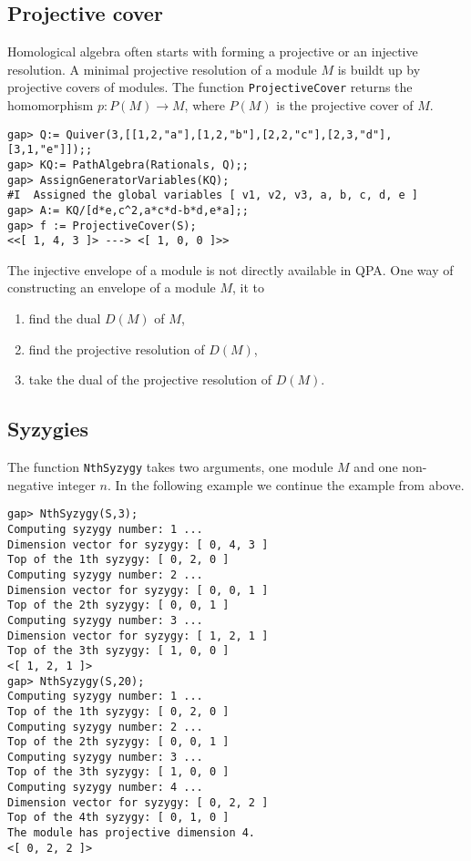 \documentclass{amsart}
\theoremstyle{definition}
\newcommand{\code}[1]{\texttt{#1}}
\theoremstyle{theoretic}
\begin{document}
\subsection{Projective cover}
Homological algebra often starts with forming a projective or an
injective resolution.  A minimal projective resolution of a module $M$
is buildt up by projective covers of modules.  The function
\code{ProjectiveCover} returns the homomorphism $p\colon P(M)\to M$,
where $P(M)$ is the projective cover of $M$.  

\begin{verbatim}
gap> Q:= Quiver(3,[[1,2,"a"],[1,2,"b"],[2,2,"c"],[2,3,"d"],
[3,1,"e"]]);;
gap> KQ:= PathAlgebra(Rationals, Q);;
gap> AssignGeneratorVariables(KQ);
#I  Assigned the global variables [ v1, v2, v3, a, b, c, d, e ]
gap> A:= KQ/[d*e,c^2,a*c*d-b*d,e*a];;
gap> f := ProjectiveCover(S);
<<[ 1, 4, 3 ]> ---> <[ 1, 0, 0 ]>>
\end{verbatim}
The injective envelope of a module is not directly available in QPA.
One way of constructing an envelope of a module $M$, it to 
\begin{enumerate}[\rm(1)]
\item find the dual $D(M)$ of $M$,
\item find the projective resolution of $D(M)$, 
\item take the dual of the projective resolution of $D(M)$. 
\end{enumerate}

\subsection{Syzygies}
The function \code{NthSyzygy} takes two arguments, one module $M$ and
one non-negative integer $n$.  In the following example we continue
the example from above. 
\begin{verbatim}
gap> NthSyzygy(S,3);
Computing syzygy number: 1 ...
Dimension vector for syzygy: [ 0, 4, 3 ]
Top of the 1th syzygy: [ 0, 2, 0 ]
Computing syzygy number: 2 ...
Dimension vector for syzygy: [ 0, 0, 1 ]
Top of the 2th syzygy: [ 0, 0, 1 ]
Computing syzygy number: 3 ...
Dimension vector for syzygy: [ 1, 2, 1 ]
Top of the 3th syzygy: [ 1, 0, 0 ]
<[ 1, 2, 1 ]>
gap> NthSyzygy(S,20);
Computing syzygy number: 1 ...
Top of the 1th syzygy: [ 0, 2, 0 ]
Computing syzygy number: 2 ...
Top of the 2th syzygy: [ 0, 0, 1 ]
Computing syzygy number: 3 ...
Top of the 3th syzygy: [ 1, 0, 0 ]
Computing syzygy number: 4 ...
Dimension vector for syzygy: [ 0, 2, 2 ]
Top of the 4th syzygy: [ 0, 1, 0 ]
The module has projective dimension 4.
<[ 0, 2, 2 ]>
\end{verbatim}
\end{document}
